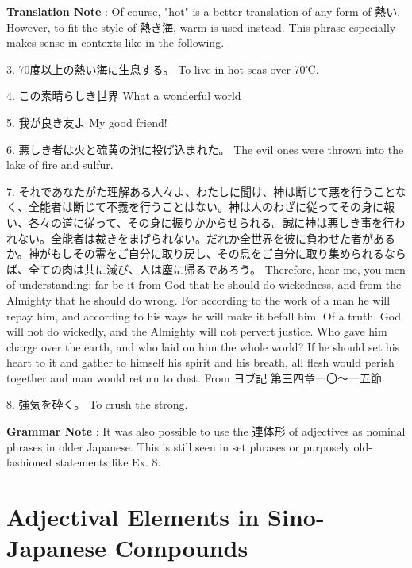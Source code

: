 \par{\textbf{Translation Note }: Of course, "hot" is a better translation of any form of 熱い. However, to fit the style of 熱き海, warm is used instead. This phrase especially makes sense in contexts like in the following. }
 
\par{3. 70度以上の熱い海に生息する。 \hfill\break
To live in hot seas over 70℃. }

\par{4. この素晴らしき世界 \hfill\break
What a wonderful world }

\par{5. 我が良き友よ \hfill\break
My good friend! }

\par{6. 悪しき者は火と硫黄の池に投げ込まれた。 \hfill\break
The evil ones were thrown into the lake of fire and sulfur. }

\par{7. それであなたがた理解ある人々よ、わたしに聞け、神は断じて悪を行うことなく、全能者は断じて不義を行うことはない。神は人のわざに従ってその身に報い、各々の道に従って、その身に振りかからせられる。誠に神は悪しき事を行われない。全能者は裁きをまげられない。だれか全世界を彼に負わせた者があるか。神がもしその霊をご自分に取り戻し、その息をご自分に取り集められるならば、全ての肉は共に滅び、人は塵に帰るであろう。 \hfill\break
Therefore, hear me, you men of understanding: far be it from God that he should do wickedness, and from the Almighty that he should do wrong. For according to the work of a man he will repay him, and according to his ways he will make it befall him. Of a truth, God will not do wickedly, and the Almighty will not pervert justice. Who gave him charge over the earth, and who laid on him the whole world? If he should set his heart to it and gather to himself his spirit and his breath, all flesh would perish together and man would return to dust. \hfill\break
From ヨブ記 第三四章一〇～一五節 }

\par{8. 強気を砕く。 \hfill\break
To crush the strong. }

\par{\textbf{Grammar Note }: It was also possible to use the 連体形 of adjectives as nominal phrases in older Japanese. This is still seen in set phrases or purposely old-fashioned statements like Ex. 8. }
      
\section{Adjectival Elements in Sino-Japanese Compounds}
 
